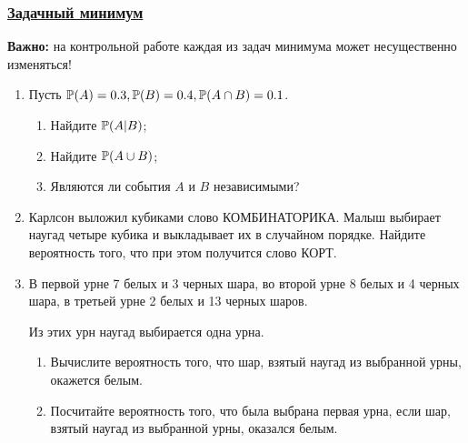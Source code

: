 \newpage
\subsubsection*{\hyperref[sec:sol_minimum_kr_01]{Задачный минимум}}\label{sec:minimum_kr_01}


\textbf{Важно:} на контрольной работе каждая из задач минимума может несущественно изменяться!

\begin{enumerate}
\item  Пусть $\P(A) = 0.3, \P(B) = 0.4, \P(A\cap B) = 0.1$.
	\begin{enumerate}
		\item  Найдите $\P(A|B)$;
		\item  Найдите $\P(A\cup B)$;
		\item  Являются ли события $A$ и $B$ независимыми?
	\end{enumerate}


\item  Карлсон выложил кубиками слово КОМБИНАТОРИКА.
Малыш выбирает наугад четыре кубика и выкладывает их в случайном порядке.
Найдите вероятность того, что при этом получится слово КОРТ.



\item  В первой урне 7 белых и 3 черных шара, во второй урне 8 белых и 4 черных
шара, в третьей урне 2 белых и 13 черных шаров.

Из этих урн наугад выбирается одна урна.
\begin{enumerate}
\item  Вычислите вероятность того, что шар, взятый наугад из выбранной урны, окажется белым.
\item  Посчитайте вероятность того, что была выбрана первая урна,
если шар, взятый наугад из выбранной урны, оказался белым.
\end{enumerate}


\end{enumerate}
